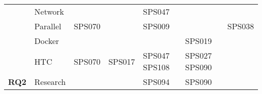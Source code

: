 \begin{table*}[htbp]
\begin{tabularx}{\textwidth}{p{0.8cm}p{2.5cm}>{\raggedright\arraybackslash}X>{\raggedright\arraybackslash}X>{\raggedright\arraybackslash}X>{\raggedright\arraybackslash}X>{\raggedright\arraybackslash}X}
		\addlinespace[0.3em]
		                                     & Network          &                    &                    & SPS047             &                    &                    \\
		\addlinespace[0.3em]
		                                     & Parallel         & SPS070             &                    & SPS009             &                    & SPS038             \\
		\addlinespace[0.3em]
		                                     & Docker           &                    &                    &                    & SPS019             &                    \\
		\addlinespace[0.3em]
		                                     & HTC              & SPS070             & SPS017             & SPS047 SPS108      & SPS027 SPS090      &                    \\
		\midrule
		\multirow{0}{*}[1.2em]{\textbf{RQ2}} & Research         &                    &                    & SPS094             & SPS090             &                    \\
		\bottomrule
	\end{tabularx}
\end{table*}

